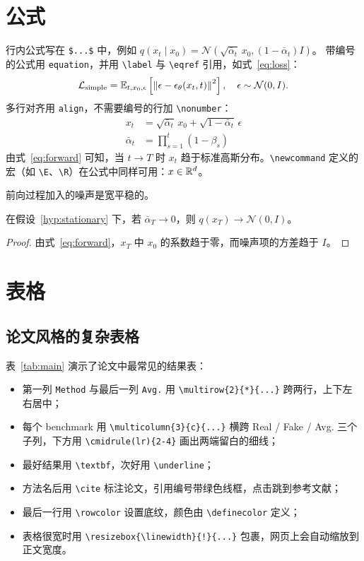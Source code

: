 \section{公式}\label{sec:math}
行内公式写在 \verb|$...$| 中，例如 $q(x_t \mid x_0) = \mathcal{N}(\sqrt{\bar\alpha_t}\,x_0, (1-\bar\alpha_t)I)$。
带编号的公式用 \texttt{equation}，并用 \verb|\label| 与 \verb|\eqref| 引用，如式~\eqref{eq:loss}：
\begin{equation}\label{eq:loss}
  \mathcal{L}_{\text{simple}} = \mathbb{E}_{t, x_0, \epsilon}\left[\left\|\epsilon - \epsilon_\theta(x_t, t)\right\|^2\right], \quad \epsilon \sim \mathcal{N}(0, I).
\end{equation}
多行对齐用 \texttt{align}，不需要编号的行加 \verb|\nonumber|：
\begin{align}
  x_t &= \sqrt{\bar\alpha_t}\,x_0 + \sqrt{1-\bar\alpha_t}\,\epsilon \label{eq:forward} \\
  \bar\alpha_t &= \prod_{s=1}^{t} (1 - \beta_s) \nonumber
\end{align}
由式~\eqref{eq:forward} 可知，当 $t \to T$ 时 $x_t$ 趋于标准高斯分布。\verb|\newcommand| 定义的宏（如 \verb|\E|、\verb|\R|）在公式中同样可用：$x \in \mathbb{R}^d$。

\begin{hyp}[平稳性]\label{hyp:stationary}
前向过程加入的噪声是宽平稳的。
\end{hyp}

\begin{theorem}[收敛性]\label{thm:converge}
在假设~\ref{hyp:stationary} 下，若 $\bar\alpha_T \to 0$，则 $q(x_T) \to \mathcal{N}(0, I)$。
\end{theorem}

\begin{proof}
由式~\eqref{eq:forward}，$x_T$ 中 $x_0$ 的系数趋于零，而噪声项的方差趋于 $I$。
\end{proof}

\section{表格}\label{sec:table}
\subsection{论文风格的复杂表格}
表~\ref{tab:main} 演示了论文中最常见的结果表：
\begin{itemize}
  \item 第一列 \texttt{Method} 与最后一列 \texttt{Avg.} 用 \verb|\multirow{2}{*}{...}| 跨两行，上下左右居中；
  \item 每个 benchmark 用 \verb|\multicolumn{3}{c}{...}| 横跨 Real / Fake / Avg. 三个子列，下方用 \verb|\cmidrule(lr){2-4}| 画出两端留白的细线；
  \item 最好结果用 \verb|\textbf|，次好用 \verb|\underline|；
  \item 方法名后用 \verb|\cite| 标注论文，引用编号带绿色线框，点击跳到参考文献；
  \item 最后一行用 \verb|\rowcolor| 设置底纹，颜色由 \verb|\definecolor| 定义；
  \item 表格很宽时用 \verb|\resizebox{\linewidth}{!}{...}| 包裹，网页上会自动缩放到正文宽度。
\end{itemize}

